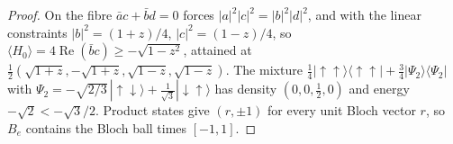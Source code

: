 \begin{proof}
  \leanok
  On the fibre $\bar ac+\bar bd=0$ forces $|a|^2|c|^2=|b|^2|d|^2$, and with the linear constraints $|b|^2=(1+z)/4$, $|c|^2=(1-z)/4$, so
  $\langle H_0\rangle=4\operatorname{Re}(\bar bc)\ge-\sqrt{1-z^2}$, attained at $\tfrac12(\sqrt{1+z},-\sqrt{1+z},\sqrt{1-z},\sqrt{1-z})$. The mixture
  $\tfrac14|{\uparrow\uparrow}\rangle\langle{\uparrow\uparrow}|+\tfrac34|\Psi_2\rangle\langle\Psi_2|$ with $\Psi_2=-\sqrt{2/3}\,|{\uparrow\downarrow}\rangle+\tfrac1{\sqrt3}|{\downarrow\uparrow}\rangle$ has density
  $(0,0,\tfrac12,0)$ and energy $-\sqrt2<-\sqrt3/2$. Product states give $(r,\pm1)$ for every unit Bloch vector $r$, so $B_e$ contains the
  Bloch ball times $[-1,1]$.
\end{proof}
